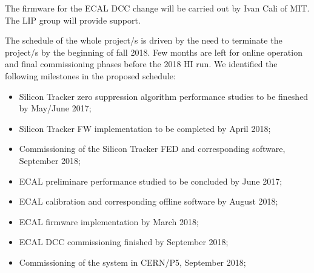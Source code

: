 The firmware for the ECAL DCC change will be carried out by Ivan Cali of MIT. The LIP group will provide support.


The schedule of the whole project/s is driven by the need to terminate the project/s by the beginning of fall 2018. Few months are left for online operation and final commissioning phases before the 2018 HI run. 
We identified the following milestones in the proposed schedule:

\begin{itemize}
\item Silicon Tracker zero suppression algorithm performance studies to be fineshed by May/June 2017;
\item Silicon Tracker FW implementation to be completed by April 2018;
\item Commissioning of the Silicon Tracker FED and corresponding software, September 2018;
\item ECAL preliminare performance studied to be concluded by June 2017;
\item ECAL calibration and corresponding offline software by August 2018;
\item ECAL firmware implementation by March 2018;
\item ECAL DCC commissioning finished by September 2018;
\item Commissioning of the system in CERN/P5, September 2018;
\end{itemize}
